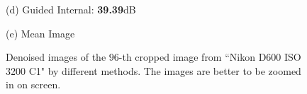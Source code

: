 \documentclass[10pt,twocolumn,letterpaper]{article}
\begin{document}
\begin{figure}
{\begin{minipage}[t]{0.195\textwidth}
{\footnotesize (d) Guided Internal: \textbf{39.39}dB }
\end{minipage}
\begin{minipage}[t]{0.195\textwidth}
\centering
{}
{\footnotesize (e) Mean Image \cite{crosschannel2016}}
\end{minipage}
}\vspace{-1mm}
\caption{Denoised images of the $96$-th cropped image from ``Nikon D600 ISO 3200 C1" \cite{crosschannel2016} by different methods. The images are better to be zoomed in on screen.}
\vspace{-1mm}
\label{fig4}
\end{figure}
\end{document}
